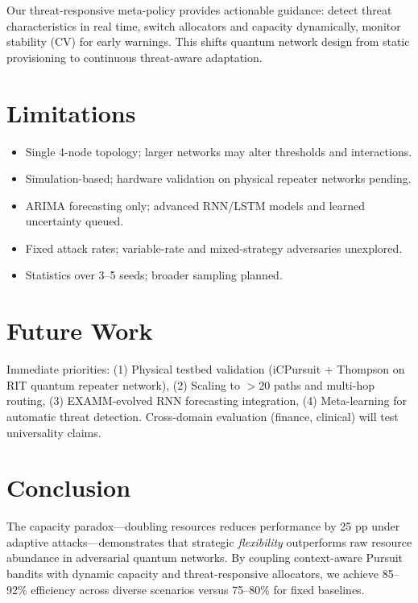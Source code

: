 \documentclass[10pt,twocolumn,journal]{IEEEtran}
\begin{document}
Our threat-responsive meta-policy provides actionable guidance: detect threat characteristics in real time, switch allocators and capacity dynamically, monitor stability (CV) for early warnings. This shifts quantum network design from static provisioning to continuous threat-aware adaptation.

\section{Limitations}
\label{sec:limitations}

\begin{itemize}
  \item Single 4-node topology; larger networks may alter thresholds and interactions.
  \item Simulation-based; hardware validation on physical repeater networks pending.
  \item ARIMA forecasting only; advanced RNN/LSTM models and learned uncertainty queued.
  \item Fixed attack rates; variable-rate and mixed-strategy adversaries unexplored.
  \item Statistics over 3--5 seeds; broader sampling planned.
\end{itemize}

\section{Future Work}
\label{sec:future}

Immediate priorities: (1) Physical testbed validation (iCPursuit + Thompson on RIT quantum repeater network), (2) Scaling to $>20$ paths and multi-hop routing, (3) EXAMM-evolved RNN forecasting integration, (4) Meta-learning for automatic threat detection. Cross-domain evaluation (finance, clinical) will test universality claims.

\section{Conclusion}
\label{sec:conclusion}

The capacity paradox—doubling resources reduces performance by 25 pp under adaptive attacks—demonstrates that strategic \textit{flexibility} outperforms raw resource abundance in adversarial quantum networks. By coupling context-aware Pursuit bandits with dynamic capacity and threat-responsive allocators, we achieve 85--92\% efficiency across diverse scenarios versus 75--80\% for fixed baselines.
\end{document}
